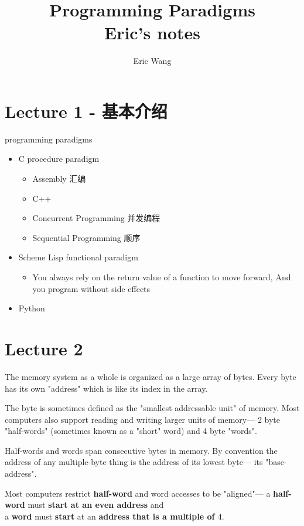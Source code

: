 \documentclass{article}
\begin{document}
\title{Programming Paradigms\\ Eric's notes}
\author{Eric Wang}
\maketitle
\newpage
\tableofcontents
\newpage

\section{Lecture 1 - 基本介绍}
programming paradigms
\begin{itemize}
\item C procedure paradigm
	\begin{itemize}
	\item Assembly 汇编
	\item C++
	\item Concurrent Programming 并发编程
	\item Sequential Programming 顺序
	\end{itemize}

\item Scheme Lisp functional paradigm
	\begin{itemize}
	\item You always rely on the return value of a function to move forward, And you program without side effects
	\end{itemize}

\item Python
\end{itemize}

\section{Lecture 2}
The memory system as a whole is organized as a large array of bytes. 
Every byte has its own "address" which is like its index in the array.

The byte is sometimes defined as the "smallest addressable unit" of memory. 
Most computers also support reading and writing larger units of memory— 2 byte "half-words" (sometimes known as a "short" word) and 4 byte "words".

Half-words and words span consecutive bytes in memory. By convention the address of any multiple-byte thing is the address of its lowest byte— its "base-address".

Most computers restrict \textbf{half-word} and word accesses to be "aligned"—
\indent a \textbf{half-word} must \textbf{start at an even address} and \\
\indent a \textbf{word} must \textbf{start} at an \textbf{address that is a multiple of $4$}.
\end{document}
